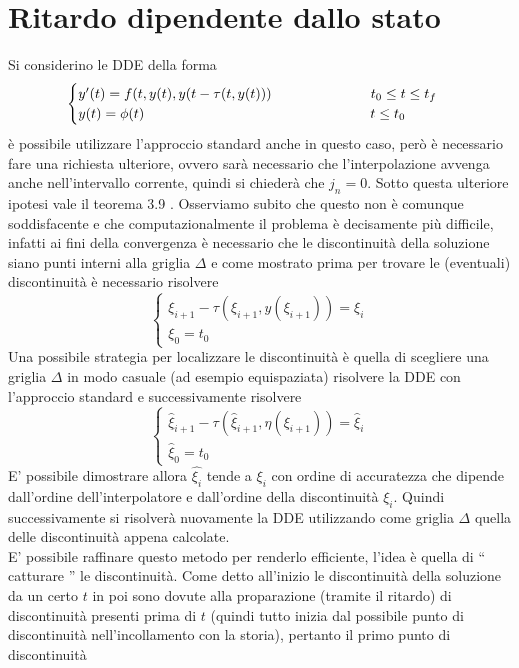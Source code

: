 \section{Ritardo dipendente dallo stato}
Si considerino le DDE della forma
$$
\begin{cases}
 y'(t) = f(t,y(t),y(t- \tau (t,y(t)))	\hspace{2.5cm}	t_0 \le t \le t_f \\
 y(t)=\phi(t)				\hspace{5.7cm}	t \le t_0
\end{cases}
$$
è possibile utilizzare l'approccio standard anche in questo caso, però è necessario fare una richiesta ulteriore, ovvero sarà 
necessario che l'interpolazione avvenga anche nell'intervallo corrente, quindi si 
chiederà che $j_n=0$. Sotto questa ulteriore ipotesi vale il teorema 3.9 \cite[par. 4.3]{2}.
Osserviamo subito che questo non è comunque soddisfacente e che computazionalmente il problema è decisamente più difficile, infatti 
ai fini della convergenza è necessario che le discontinuità della soluzione siano punti interni alla griglia $\Delta$ e come mostrato 
prima per trovare le (eventuali) discontinuità è necessario risolvere
$$
\begin{cases}
\xi_{i+1}-\tau(\xi_{i+1},y(\xi_{i+1}))= \xi_i		\\
\xi_0=t_0
\end{cases}
$$
Una possibile strategia per localizzare le discontinuità è quella di scegliere una griglia $\Delta$ in modo casuale (ad esempio equispaziata) 
 risolvere la DDE con l'approccio standard e successivamente risolvere
$$
\begin{cases}
\widehat{\xi}_{i+1}-\tau(\widehat{\xi}_{i+1},\eta(\xi_{i+1}))= \widehat{\xi}_i		\\
\widehat{\xi}_0=t_0
\end{cases}
$$
E' possibile dimostrare allora $\widehat{\xi_i}$ tende a $\xi_i$ con ordine di accuratezza che dipende dall'ordine dell'interpolatore e 
dall'ordine della discontinuità $\xi_i$. Quindi successivamente si risolverà nuovamente la DDE utilizzando come griglia $\Delta$ quella 
delle discontinuità appena calcolate.
\vspace{0.5cm}\\
E' possibile raffinare questo metodo per renderlo efficiente, l'idea è quella di `` catturare '' le discontinuità. Come detto all'inizio 
le discontinuità della soluzione da un certo $t$ in poi sono dovute alla proparazione (tramite il ritardo) di discontinuità presenti 
prima di $t$ (quindi tutto inizia dal possibile punto di discontinuità nell'incollamento con la storia), pertanto il primo punto di discontinuità 
